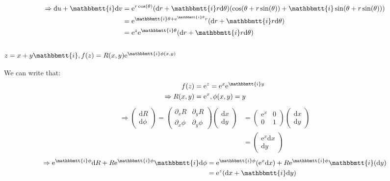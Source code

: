 \documentclass[]{ctexart}
\newcommand{\mi}{\mathbbmtt{i}}
\newcommand{\di}{\mathrm{d}}
\newcommand{\pa}{\partial}
\newcommand{\me}{\mathrm{e}}
\begin{document}
				\begin{equation*}
				\begin{aligned}
					\Rightarrow \di u+\mi \di v
					&=\me^{r \cos (\theta )} (\di r+\mi r \di \theta) (\cos (\theta +r \sin (\theta ))+\mi \sin (\theta +r \sin (\theta )))\\
					&=\me^{\mi \theta +\me^{\mi \theta } r} (\di r+\mi r \di \theta)\\
					&=\me ^z\me ^{\mi \theta}(\di r+\mi r \di \theta)
				\end{aligned}
				\end{equation*}
				
		\subsubsection{$z=x+y\mi, f(z)=R(x,y)\me ^{\mi \phi (x,y)}$}
			We can write that:
				\begin{equation*}
				\begin{aligned}
					f(z)&=\me ^{z}=\me ^{x}\me ^{\mi y}\\
					\Rightarrow R(x,y)&=\me ^{x},\phi (x,y)=y
				\end{aligned}
				\end{equation*}
				\begin{equation*}
				\begin{aligned}
					\Rightarrow
					\begin{pmatrix}
						\di R\\
						\di \phi 
					\end{pmatrix}
					=
					\begin{pmatrix}
						\pa_xR & \pa_{y}R\\
						\pa_x\phi & \pa_{y}\phi
					\end{pmatrix}
					\begin{pmatrix}
						\di x\\
						\di y
					\end{pmatrix}
					&=
					\begin{pmatrix}
						\me ^{x} & 0\\
						0 & 1
					\end{pmatrix}
					\begin{pmatrix}
						\di x\\
						\di y
					\end{pmatrix}\\
					&=
					\begin{pmatrix}
						\me ^x \di x\\
						\di y
					\end{pmatrix}
				\end{aligned}
				\end{equation*}
				\begin{equation*}
				\begin{aligned}
					\Rightarrow \me ^{\mi \phi }\di R+R\me ^{\mi \phi}\mi \di \phi&=\me ^{\mi \phi }(\me ^x\di x)+R\me ^{\mi \phi}\mi(\di y)\\
					&=\me ^{z}(\di x+\mi \di y)
				\end{aligned}
				\end{equation*}
			
\end{document}
